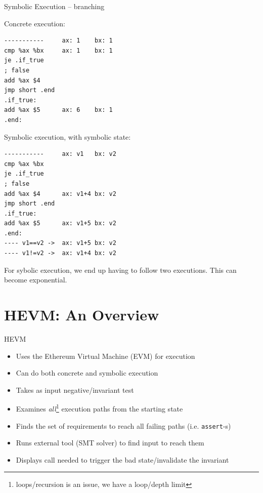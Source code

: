 \documentclass[aspectratio=169]{beamer}
\begin{document}
\begin{frame}[fragile=singleslide]{Symbolic Execution -- branching}
\begin{minipage}[t]{0.45\textwidth}
Concrete execution:
\begin{Verbatim}[fontsize=\small]
-----------     ax: 1    bx: 1
cmp %ax %bx     ax: 1    bx: 1
je .if_true     
; false
add %ax $4
jmp short .end
.if_true:
add %ax $5      ax: 6    bx: 1
.end:
\end{Verbatim}
\end{minipage}%
\begin{minipage}[t]{0.45\textwidth}
Symbolic execution, with symbolic state:
\begin{Verbatim}[fontsize=\small]
-----------     ax: v1   bx: v2
cmp %ax %bx     
je .if_true     
; false
add %ax $4      ax: v1+4 bx: v2
jmp short .end
.if_true:
add %ax $5      ax: v1+5 bx: v2
.end:
---- v1==v2 ->  ax: v1+5 bx: v2
---- v1!=v2 ->  ax: v1+4 bx: v2
\end{Verbatim}
\end{minipage}
\bigskip

For sybolic execution, we end up having to follow two executions. This can become exponential.

\end{frame}

\section{HEVM: An Overview}
\begin{frame}{HEVM}
\begin{itemize}
\item Uses the Ethereum Virtual Machine (EVM) for execution
\item Can do both concrete and symbolic execution
\item Takes as input negative/invariant test
\item Examines \emph{all}\footnote{loops/recursion is an issue, we have a loop/depth limit} execution paths from the starting state
\item Finds the set of requirements to reach all failing paths (i.e. \texttt{assert}-s)
\item Runs external tool (SMT solver) to find input to reach them
\item Displays call needed to trigger the bad state/invalidate the invariant
\end{itemize}
\end{frame}
\end{document}
